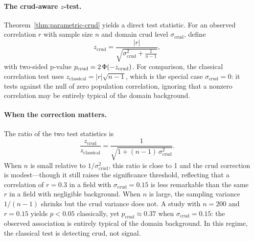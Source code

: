 \paragraph{The crud-aware $z$-test.}
Theorem~\ref{thm:parametric-crud} yields a direct test statistic. For an observed correlation $r$ with sample size $n$ and domain crud level $\sigma_{\mathrm{crud}}$, define
\begin{equation}\label{eq:z-crud}
z_{\mathrm{crud}} = \frac{|r|}{\sqrt{\sigma_{\mathrm{crud}}^2 + \frac{1}{n-1}}},
\end{equation}
with two-sided p-value $p_{\mathrm{crud}} = 2\,\Phi(-z_{\mathrm{crud}})$.
For comparison, the classical correlation test uses $z_{\mathrm{classical}}=|r|\sqrt{n-1}$, which is the special case $\sigma_{\mathrm{crud}}=0$: it tests against the null of zero population correlation, ignoring that a nonzero correlation may be entirely typical of the domain background.

\paragraph{When the correction matters.}
The ratio of the two test statistics is
\begin{equation}
\frac{z_{\mathrm{crud}}}{z_{\mathrm{classical}}} = \frac{1}{\sqrt{1 + (n-1)\,\sigma_{\mathrm{crud}}^2}}.
\end{equation}
When $n$ is small relative to $1/\sigma_{\mathrm{crud}}^2$, this ratio is close to 1 and the crud correction is modest---though it still raises the significance threshold, reflecting that a correlation of $r=0.3$ in a field with $\sigma_{\mathrm{crud}}=0.15$ is less remarkable than the same $r$ in a field with negligible background.
When $n$ is large, the sampling variance $1/(n-1)$ shrinks but the crud variance does not.
A study with $n=200$ and $r=0.15$ yields $p<0.05$ classically, yet $p_{\mathrm{crud}}\approx 0.37$ when $\sigma_{\mathrm{crud}}=0.15$: the observed association is entirely typical of the domain background.
In this regime, the classical test is detecting crud, not signal.

